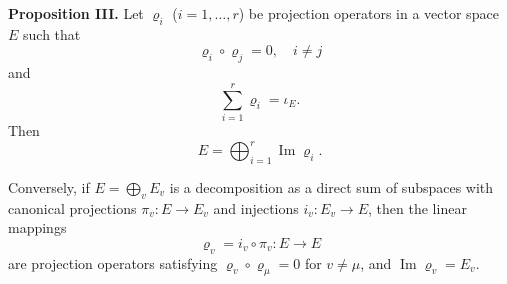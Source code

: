 \textbf{Proposition III.} Let $\varrho_i$ ($i = 1, \ldots, r$) be projection operators in a vector space $E$ such that
$$\varrho_i \circ \varrho_j = 0, \quad i \neq j$$
and
$$\sum_{i=1}^{r} \varrho_i = \iota_E.$$
Then
$$E = \bigoplus_{i=1}^{r} \operatorname{Im} \varrho_i.$$

Conversely, if $E = \bigoplus_v E_v$ is a decomposition as a direct sum of subspaces with canonical projections $\pi_v: E \to E_v$ and injections $i_v: E_v \to E$, then the linear mappings
$$\varrho_v = i_v \circ \pi_v: E \to E$$
are projection operators satisfying $\varrho_v \circ \varrho_\mu = 0$ for $v \neq \mu$, and $\operatorname{Im} \varrho_v = E_v$.
